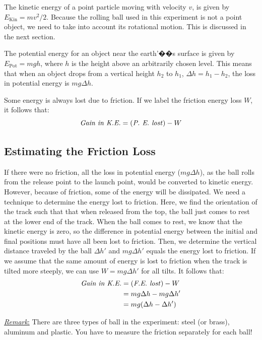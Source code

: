 The kinetic energy of a point particle moving with velocity $v$, is given by $E_{\textrm{Kin}}=mv^2/2$. Because the rolling ball used in this experiment is not a point object, we need to take into account its rotational motion. This is discussed in the next section. \myskip

The potential energy for an object near the earth'��s surface is given by $E_{\textrm{Pot}}=mgh$, where $h$ is the height above an arbitrarily chosen level. This means that when an object drops from a vertical height $h_2$ to $h_1$, $\Delta h=h_1-h_2$, the loss in potential energy is $mg\Delta h$.\myskip

Some energy is always lost due to friction. If we label the friction energy loss $W$, it follows that:
\begin{equation}
\textrm{\emph{Gain in K.E.}} = (\textrm{\emph{P. E. lost}}) - W
\end{equation}

\subsection{Estimating the Friction Loss}

If there were no friction, all the loss in potential energy ($mg\Delta h$), as the ball rolls from the release point to the launch point, would be converted to kinetic energy. However, because of friction, some of the energy will be dissipated. We need a technique to determine the energy lost to friction. Here, we find the orientation of the track such that that when released from the top, the ball just comes to rest at the lower end of the track. When the ball comes to rest, we know that the kinetic energy is zero, so the difference in potential energy between the initial and final positions must have all been lost to friction. Then, we determine the vertical distance traveled by the ball $\Delta h'$ and $mg\Delta h'$ equals the energy lost to friction. If we assume that the same amount of energy is lost to friction when the track is tilted more steeply, we can use $W=mg\Delta h'$ for all tilts. It follows that:
\begin{align}
  \textrm{\emph{Gain in K.E.}}&=(\textrm{\emph{F.E. lost}})-W\\
  &=mg\Delta h-mg\Delta h'\\
  &=mg(\Delta h-\Delta h')
\end{align}

\underline{\emph{Remark}:} There are three types of ball in the experiment: steel (or brass), aluminum and plastic. You have to measure the friction separately for each ball!

